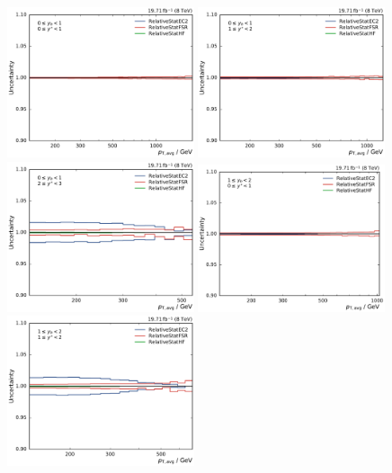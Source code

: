\begin{figure}[htbp]
    \centering
    \includegraphics[width=0.49\textwidth]{figures/measurement/jec_relunc_4_yb0ys0.pdf}\hfill
    \includegraphics[width=0.49\textwidth]{figures/measurement/jec_relunc_4_yb0ys1.pdf}
    \includegraphics[width=0.49\textwidth]{figures/measurement/jec_relunc_4_yb0ys2.pdf}\hfill
    \includegraphics[width=0.49\textwidth]{figures/measurement/jec_relunc_4_yb1ys0.pdf}
    \includegraphics[width=0.49\textwidth]{figures/measurement/jec_relunc_4_yb1ys1.pdf}\hfill

\end{figure}
